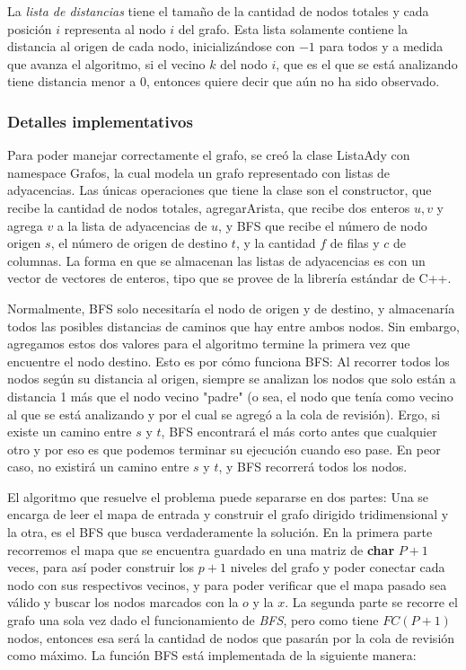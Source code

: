         La \textit{lista de distancias} tiene el tamaño de la cantidad de nodos totales y cada posición $i$ representa al nodo $i$ del grafo. Esta lista solamente contiene la distancia al origen de cada nodo, inicializándose con $-1$ para todos y a medida que avanza el algoritmo, si el vecino $k$ del nodo $i$, que es el que se está analizando tiene distancia menor a $0$, entonces quiere decir que aún no ha sido observado.


        \subsubsection{Detalles implementativos}
            Para poder manejar correctamente el grafo, se creó la clase ListaAdy con namespace Grafos, la cual modela un grafo representado con listas de adyacencias. Las únicas operaciones que tiene la clase son el constructor, que recibe la cantidad de nodos totales, agregarArista, que recibe dos enteros $u,v$ y agrega $v$ a la lista de adyacencias de $u$, y BFS que recibe el número de nodo origen $s$, el número de origen de destino $t$, y la cantidad $f$ de filas y $c$ de columnas.
            La forma en que se almacenan las listas de adyacencias es con un vector de vectores de enteros, tipo que se provee de la librería estándar de C++.

            Normalmente, BFS solo necesitaría el nodo de origen y de destino, y almacenaría todos las posibles distancias de caminos que hay entre ambos nodos. Sin embargo, agregamos estos dos valores para el algoritmo termine la primera vez que encuentre el nodo destino. Esto es por cómo funciona BFS: Al recorrer todos los nodos según su distancia al origen, siempre se analizan los nodos que solo están a distancia 1 más que el nodo vecino "padre" (o sea, el nodo que tenía como vecino al que se está analizando y por el cual se agregó a la cola de revisión). Ergo, si existe un camino entre $s$ y $t$, BFS encontrará el más corto antes que cualquier otro y por eso es que podemos terminar su ejecución cuando eso pase. En peor caso, no existirá un camino entre $s$ y $t$, y BFS recorrerá todos los nodos.

            El algoritmo que resuelve el problema puede separarse en dos partes: Una se encarga de leer el mapa de entrada y construir el grafo dirigido tridimensional y la otra, es el BFS que busca verdaderamente la solución.
            En la primera parte recorremos el mapa que se encuentra guardado en una matriz de \textbf{char} $P+1$ veces, para así poder construir los $p+1$ niveles del grafo y poder conectar cada nodo con sus respectivos vecinos, y para poder verificar que el mapa pasado sea válido y buscar los nodos marcados con la $o$ y la $x$.
            La segunda parte se recorre el grafo una sola vez dado el funcionamiento de \textit{BFS}, pero como tiene $FC(P+1)$ nodos, entonces esa será la cantidad de nodos que pasarán por la cola de revisión como máximo. La función BFS está implementada de la siguiente manera:


